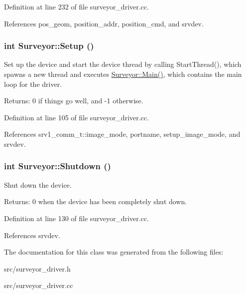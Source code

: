 Definition at line 232 of file surveyor\_\-driver.cc.

References pos\_\-geom, position\_\-addr, position\_\-cmd, and srvdev.\hypertarget{classSurveyor_c127d6028c08790fe79902b1b8359468}{
\subsubsection[{Setup}]{\setlength{\rightskip}{0pt plus 5cm}int Surveyor::Setup ()}}
\label{classSurveyor_c127d6028c08790fe79902b1b8359468}


Set up the device and start the device thread by calling StartThread(), which spawns a new thread and executes \hyperlink{classSurveyor_e6ae9ea8d60a2038b6dacdab7ccee458}{Surveyor::Main()}, which contains the main loop for the driver. 

\begin{Desc}
\item[Returns:]0 if things go well, and -1 otherwise. \end{Desc}


Definition at line 105 of file surveyor\_\-driver.cc.

References srv1\_\-comm\_\-t::image\_\-mode, portname, setup\_\-image\_\-mode, and srvdev.\hypertarget{classSurveyor_cfe0180d05f0a34474a75cdfd87b1a81}{
\subsubsection[{Shutdown}]{\setlength{\rightskip}{0pt plus 5cm}int Surveyor::Shutdown ()}}
\label{classSurveyor_cfe0180d05f0a34474a75cdfd87b1a81}


Shut down the device. 

\begin{Desc}
\item[Returns:]0 when the device has been completely shut down. \end{Desc}


Definition at line 130 of file surveyor\_\-driver.cc.

References srvdev.

The documentation for this class was generated from the following files:\begin{CompactItemize}
\item 
src/surveyor\_\-driver.h\item 
src/surveyor\_\-driver.cc\end{CompactItemize}
